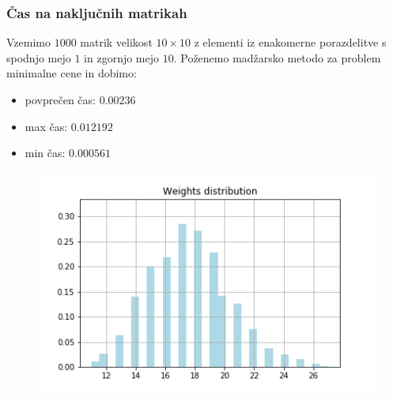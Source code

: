 \documentclass{beamer}
\begin{document}
\begin{frame}
    \frametitle{Čas na naključnih matrikah}
    \begin{block}{}
        Vzemimo $1000$ matrik velikost $10 \times 10$ z elementi iz enakomerne 
        porazdelitve s spodnjo mejo $1$ in zgornjo mejo $10$.
        Poženemo madžarsko metodo za problem minimalne cene in dobimo:
        \begin{itemize}
            \item povprečen čas: $0.00236$
            \item max čas: $0.012192$
            \item min čas: $0.000561$
        \end{itemize}
    \end{block}
    \begin{figure}[htbp]
        \centerline{\includegraphics[scale=0.40]{picture1011min.png}}
    \end{figure}
\end{frame}
\end{document}
